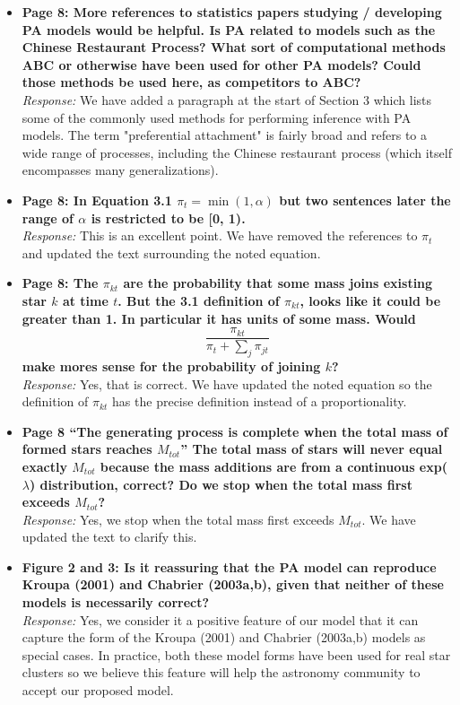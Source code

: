 \documentclass[11pt, oneside]{article}   	%
\begin{document}
\begin{itemize}
\item  {\bf Page 8: More references to statistics papers studying / developing PA models would be helpful. Is PA related to models such as the Chinese Restaurant Process? What sort of computational methods ABC or otherwise have been used for other PA models? Could those methods be used here, as competitors to ABC?} \\
\noindent \emph{Response:} We have added a paragraph at the start of Section 3 which lists some of the commonly used
methods for performing inference with PA models. The term "preferential attachment" is fairly broad and refers to
a wide range of processes, including the Chinese restaurant process (which itself encompasses many generalizations).

\bigskip

\item {\bf Page 8: In Equation 3.1 $\pi_t = \min(1,\alpha)$ but two sentences later the range of $\alpha$ is restricted to be [0, 1).} \\
\noindent \emph{Response:} This is an excellent point.  We have removed the references to $\pi_t$ and updated the text surrounding the noted equation.
\bigskip

\item  {\bf Page 8: The $\pi_{kt}$ are the probability that some mass joins existing star $k$ at time $t$. But the 3.1 definition of $\pi_{kt}$, looks like it could be greater than 1. In particular it has units
of some mass. Would $$\frac{\pi_{kt}}{\pi_t + \sum_j \pi_{jt}}$$
make mores sense for the probability of joining $k$?} \\
\noindent \emph{Response:} Yes, that is correct.  We have updated the noted equation so the definition of $\pi_{kt}$ has the precise definition instead of a proportionality.
\bigskip

\item {\bf Page 8 ``The generating process is complete when the total mass of formed stars reaches $M_{tot}$'' The total mass of stars will never equal exactly $M_{tot}$ because the mass additions are from a continuous exp($\lambda$) distribution, correct? Do we stop when the total mass first exceeds $M_{tot}$?}\\
\noindent \emph{Response:} Yes, we stop when the total mass first exceeds  $M_{tot}$.  We have updated the text to clarify this.
\bigskip

\item  {\bf Figure 2 and 3: Is it reassuring that the PA model can reproduce Kroupa (2001) and Chabrier (2003a,b), given that neither of these models is necessarily correct?}\\
\noindent \emph{Response:} Yes, we consider it a positive feature of our model that it can capture the form of the Kroupa (2001) and Chabrier (2003a,b) models as special cases.  In practice, both these model forms have been used for real star clusters so we believe this feature will help the astronomy community to accept our proposed model.
\bigskip


\end{itemize}
\end{document}
